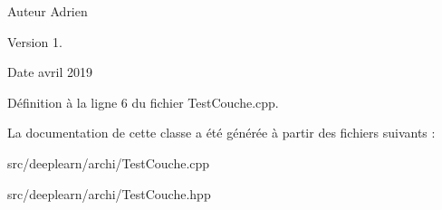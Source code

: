 \begin{DoxyAuthor}{Auteur}
Adrien 
\end{DoxyAuthor}
\begin{DoxyVersion}{Version}
1. 
\end{DoxyVersion}
\begin{DoxyDate}{Date}
avril 2019 
\end{DoxyDate}


Définition à la ligne 6 du fichier Test\+Couche.\+cpp.



La documentation de cette classe a été générée à partir des fichiers suivants \+:\begin{DoxyCompactItemize}
\item 
src/deeplearn/archi/Test\+Couche.\+cpp\item 
src/deeplearn/archi/Test\+Couche.\+hpp\end{DoxyCompactItemize}
